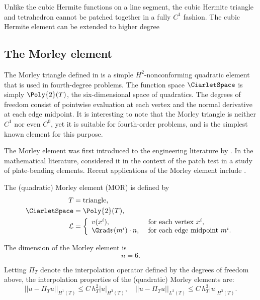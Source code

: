 Unlike the cubic Hermite functions on a line segment, the cubic
Hermite triangle and tetrahedron cannot be patched together in a fully
$C^1$ fashion. The cubic Hermite element can be extended to higher
degree \citep{BrennerScott2008}


\subsection{The Morley element}

The Morley triangle defined in \citet{Morley1968} is a simple
$H^2$-nonconforming quadratic element that is used in fourth-degree
problems. The function space $\CiarletSpace$ is simply $\Poly{2}(T)$,
the six-dimensional space of quadratics. The degrees of freedom
consist of pointwise evaluation at each vertex and the normal
derivative at each edge midpoint. It is interesting to note that the
Morley triangle is neither $C^1$ nor even $C^0$, yet it is suitable
for fourth-order problems, and is the simplest known element for this
purpose.

The Morley element was first introduced to the engineering literature
by \citet{Morley1968,Morley1971}. In the mathematical literature,
\citet{LascauxLesaint1975} considered it in the context of the patch
test in a study of plate-bending elements. Recent applications of the
Morley element include \citet{HuangGuoShi2008,MinXu2006}.

\begin{definition}
  The (quadratic) Morley element ($\mathrm{MOR}$) is defined by
  \begin{align}
    T &= \mathrm{triangle}, \\
    \CiarletSpace &= \Poly{2}(T), \\
    \mathcal{L} &=
    \left \{
    \begin{array}{ll}
      v(x^i),
      &\text{ for each vertex } x^i, \\
      \Grad v(m^i) \cdot n,
      &\text{ for each edge midpoint } m^i. \\
    \end{array}
    \right.
  \end{align}
\end{definition}
The dimension of the Morley element is
\begin{equation}
  n = 6.
\end{equation}

Letting $\Pi_T$ denote the interpolation operator defined by the
degrees of freedom above, the interpolation properties of the
(quadratic) Morley elements are:
\begin{equation}
  ||u - \Pi_T u||_{H^1(T)} \leqslant C \, h_T^{2} |u|_{H^3(T)}, \quad
  ||u - \Pi_T u||_{L^2(T)} \leqslant C \, h_T^{3} |u|_{H^3(T)}.
\end{equation}

